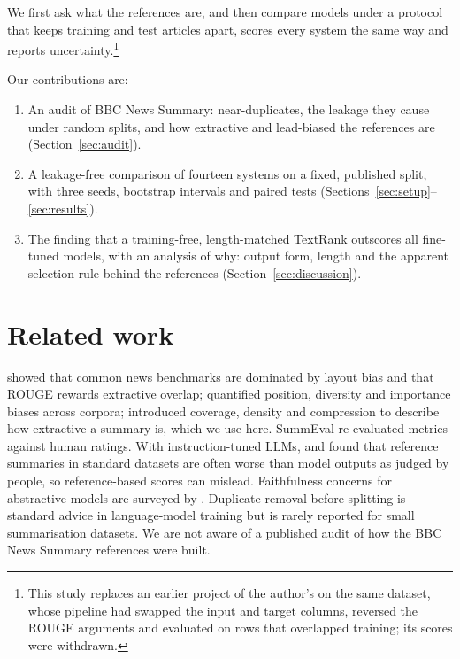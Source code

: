 \documentclass[11pt,a4paper]{article}
\begin{document}
We first ask what the references are, and then compare models under a protocol that keeps training and test articles apart, scores every system the same way and reports uncertainty.\footnote{This study replaces an earlier project of the author's on the same dataset, whose pipeline had swapped the input and target columns, reversed the ROUGE arguments and evaluated on rows that overlapped training; its scores were withdrawn.}

Our contributions are:
\begin{enumerate}
  \item An audit of BBC News Summary: near-duplicates, the leakage they cause under random splits, and how extractive and lead-biased the references are (Section~\ref{sec:audit}).
  \item A leakage-free comparison of fourteen systems on a fixed, published split, with three seeds, bootstrap intervals and paired tests (Sections~\ref{sec:setup}--\ref{sec:results}).
  \item The finding that a training-free, length-matched TextRank \cite{mihalcea2004textrank} outscores all fine-tuned models, with an analysis of why: output form, length and the apparent selection rule behind the references (Section~\ref{sec:discussion}).
\end{enumerate}

\section{Related work}
\citet{kryscinski2019critical} showed that common news benchmarks are dominated by layout bias and that ROUGE rewards extractive overlap; \citet{jung2019earlier} quantified position, diversity and importance biases across corpora; \citet{grusky2018newsroom} introduced coverage, density and compression to describe how extractive a summary is, which we use here. SummEval \cite{fabbri2021summeval} re-evaluated metrics against human ratings. With instruction-tuned LLMs, \citet{goyal2022gpt3} and \citet{zhang2024benchmarking} found that reference summaries in standard datasets are often worse than model outputs as judged by people, so reference-based scores can mislead. Faithfulness concerns for abstractive models are surveyed by \citet{maynez2020faithfulness}. Duplicate removal before splitting is standard advice in language-model training \cite{lee2022dedup} but is rarely reported for small summarisation datasets. We are not aware of a published audit of how the BBC News Summary references were built.
\end{document}
